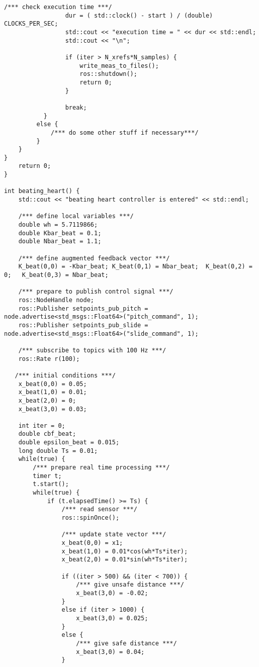 \begin{lstlisting}[language=gedit]
                 /*** check execution time ***/
                 dur = ( std::clock() - start ) / (double) CLOCKS_PER_SEC;
                 std::cout << "execution time = " << dur << std::endl; 
                 std::cout << "\n";

                 if (iter > N_xrefs*N_samples) {
                     write_meas_to_files();
                     ros::shutdown();
                     return 0;
                 }

                 break;
           }
         else {
             /*** do some other stuff if necessary***/
         }
    }
}
    return 0;
}
                    
int beating_heart() {
    std::cout << "beating heart controller is entered" << std::endl;

    /*** define local variables ***/
    double wh = 5.7119866;
    double Kbar_beat = 0.1;
    double Nbar_beat = 1.1;

    /*** define augmented feedback vector ***/
    K_beat(0,0) = -Kbar_beat; K_beat(0,1) = Nbar_beat;  K_beat(0,2) = 0;   K_beat(0,3) = Nbar_beat;

    /*** prepare to publish control signal ***/ 
    ros::NodeHandle node;
    ros::Publisher setpoints_pub_pitch = node.advertise<std_msgs::Float64>("pitch_command", 1);
    ros::Publisher setpoints_pub_slide = node.advertise<std_msgs::Float64>("slide_command", 1);

    /*** subscribe to topics with 100 Hz ***/
    ros::Rate r(100);

   /*** initial conditions ***/
    x_beat(0,0) = 0.05;    
    x_beat(1,0) = 0.01;   
    x_beat(2,0) = 0;   
    x_beat(3,0) = 0.03;

    int iter = 0;
    double cbf_beat;
    double epsilon_beat = 0.015;
    long double Ts = 0.01;
    while(true) {
        /*** prepare real time processing ***/
        timer t;
        t.start();
        while(true) {
            if (t.elapsedTime() >= Ts) {
                /*** read sensor ***/ 
                ros::spinOnce();

                /*** update state vector ***/
                x_beat(0,0) = x1; 
                x_beat(1,0) = 0.01*cos(wh*Ts*iter);
                x_beat(2,0) = 0.01*sin(wh*Ts*iter);
               
                if ((iter > 500) && (iter < 700)) {
                    /*** give unsafe distance ***/
                    x_beat(3,0) = -0.02;
                }
                else if (iter > 1000) {
                    x_beat(3,0) = 0.025;
                }
                else {
                    /*** give safe distance ***/
                    x_beat(3,0) = 0.04;
                }
                

\end{lstlisting}
